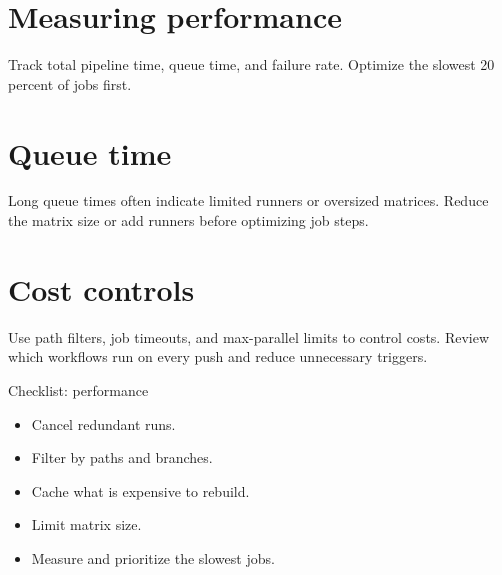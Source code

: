 \section{Measuring performance}
Track total pipeline time, queue time, and failure rate.
Optimize the slowest 20 percent of jobs first.

\section{Queue time}
Long queue times often indicate limited runners or oversized matrices.
Reduce the matrix size or add runners before optimizing job steps.

\section{Cost controls}
Use path filters, job timeouts, and max-parallel limits to control costs.
Review which workflows run on every push and reduce unnecessary triggers.

\begin{checklistbox}{Checklist: performance}
\begin{itemize}[nosep]
  \item Cancel redundant runs.
  \item Filter by paths and branches.
  \item Cache what is expensive to rebuild.
  \item Limit matrix size.
  \item Measure and prioritize the slowest jobs.
\end{itemize}
\end{checklistbox}
